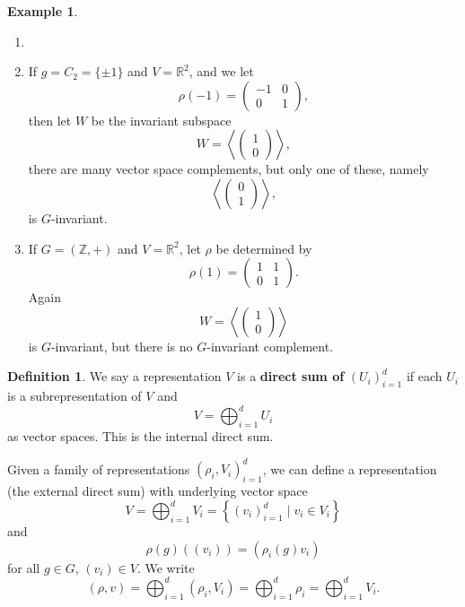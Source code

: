 \documentclass[12pt]{article}
\theoremstyle{definition}
\newtheorem{definition}{Definition}[section]
\newtheorem{example}{Example}[section]
\theoremstyle{remark}
\begin{document}
\begin{example}
	\begin{enumerate}[(1)]
		\item[]
		\item If $g = C_2 = \{\pm 1\}$ and $V = \mathbb{R}^2$, and we let
			\[
				\rho(-1) = 
				\begin{pmatrix}
					-1 & 0 \\
					0 & 1
				\end{pmatrix}
			,\]
			then let $W$ be the invariant subspace
			\[
			W = \left\langle
				\begin{pmatrix}
					1 \\
					0
				\end{pmatrix}
			\right \rangle
			,\]
			there are many vector space complements, but only one of these, namely
			\[
			\left \langle
				\begin{pmatrix}
					0 \\
					1
				\end{pmatrix}
			\right \rangle
			,\]
			is $G$-invariant.
		\item If $G = (\mathbb{Z},+)$ and $V = \mathbb{R}^2$, let $\rho$ be determined by
			\[
				\rho(1) =
				\begin{pmatrix}
					1 & 1 \\
					0 & 1
				\end{pmatrix}
			.\]
			Again
			\[
			W = \left \langle
				\begin{pmatrix}
					1 \\
					0
				\end{pmatrix}
			\right \rangle
			\]
			is $G$-invariant, but there is no $G$-invariant complement.
	\end{enumerate}
\end{example}

\begin{definition}
	We say a representation $V$ is a \textbf{direct sum of} $(U_i)_{i = 1}^{d}$ if each $U_i$ is a subrepresentation of $V$ and
	\[
	V = \bigoplus_{i = 1}^{d} U_i
	\]
	as vector spaces. This is the internal direct sum.

	Given a family of representations $(\rho_i, V_i)_{i = 1}^{d}$, we can define a representation (the external direct sum) with underlying vector space
	\[
		V = \bigoplus_{i = 1}^{d} V_i = \left\{(v_i)_{i = 1}^{d} \mid v_i \in V_i \right\}
	\]
	and
	\[
		\rho(g) ((v_i)) = (\rho_i(g) v_i)
	\]
	for all $g \in G$, $(v_i) \in V$. We write
	\[
		(\rho, v) = \bigoplus_{i = 1}^{d}(\rho_i, V_i) = \bigoplus_{i = 1}^{d} \rho_i = \bigoplus_{i = 1}^{d} V_i
	.\]
\end{definition}
\end{document}
